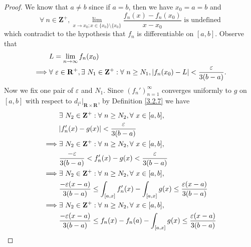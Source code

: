 \begin{proof}
    We know that \(a \neq b\) since if \(a = b\), then we have \(x_0 = a = b\) and
    \[
        \forall\ n \in \mathbf{Z}^+, \lim_{x \to x_0; x \in \{x_0\} \setminus \{x_0\}} \frac{f_n(x) - f_n(x_0)}{x - x_0} \text{ is undefined}
    \]
    which contradict to the hypothesis that \(f_n\) is differentiable on \([a, b]\).
    Observe that
    \begin{align*}
                 & L = \lim_{n \to \infty} f_n(x_0)                                                                                                                \\
        \implies & \forall\ \varepsilon \in \mathbf{R}^+, \exists\ N_1 \in \mathbf{Z}^+ : \forall\ n \geq N_1, \abs*{f_n(x_0) - L} < \frac{\varepsilon}{3(b - a)}.
    \end{align*}
    Now we fix one pair of \(\varepsilon\) and \(N_1\).
    Since \((f_n')_{n = 1}^\infty\) converges uniformly to \(g\) on \([a, b]\) with respect to \(d_{l^1}|_{\mathbf{R} \times \mathbf{R}}\), by Definition \ref{3.2.7} we have
    \begin{align*}
                 & \exists\ N_2 \in \mathbf{Z}^+ : \forall\ n \geq N_2, \forall\ x \in [a, b],                                                     \\
                 & \abs*{f_n'(x) - g(x)} < \frac{\varepsilon}{3(b - a)}                                                                            \\
        \implies & \exists\ N_2 \in \mathbf{Z}^+ : \forall\ n \geq N_2, \forall\ x \in [a, b],                                                     \\
                 & \frac{-\varepsilon}{3(b - a)} < f_n'(x) - g(x) < \frac{\varepsilon}{3(b - a)}                                                   \\
        \implies & \exists\ N_2 \in \mathbf{Z}^+ : \forall\ n \geq N_2, \forall\ x \in [a, b],                                                     \\
                 & \frac{-\varepsilon (x - a)}{3(b - a)} \leq \int_{[a, x]} f_n'(x) - \int_{[a, x]} g(x) \leq \frac{\varepsilon (x - a)}{3(b - a)} \\
        \implies & \exists\ N_2 \in \mathbf{Z}^+ : \forall\ n \geq N_2, \forall\ x \in [a, b],                                                     \\
                 & \frac{-\varepsilon (x - a)}{3(b - a)} \leq f_n(x) - f_n(a) - \int_{[a, x]} g(x) \leq \frac{\varepsilon (x - a)}{3(b - a)}       \\

\end{align*}
\end{proof}
